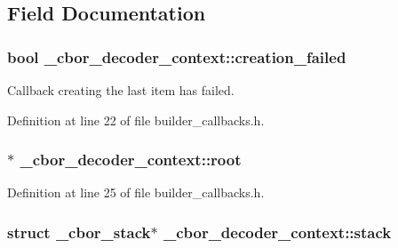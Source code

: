 \subsection{Field Documentation}
\hypertarget{struct__cbor__decoder__context_ada14322afd080c27f3ea76b3ba657505}{
\subsubsection[{creation\-\_\-failed}]{\setlength{\rightskip}{0pt plus 5cm}bool \-\_\-cbor\-\_\-decoder\-\_\-context\-::creation\-\_\-failed}}\label{struct__cbor__decoder__context_ada14322afd080c27f3ea76b3ba657505}


Callback creating the last item has failed. 



Definition at line 22 of file builder\-\_\-callbacks.\-h.

\hypertarget{struct__cbor__decoder__context_ad4c1540245b6241bc7aa3f7ade2fbf5a}{
\subsubsection[{root}]{$\ast$ \-\_\-cbor\-\_\-decoder\-\_\-context\-::root}}\label{struct__cbor__decoder__context_ad4c1540245b6241bc7aa3f7ade2fbf5a}


Definition at line 25 of file builder\-\_\-callbacks.\-h.

\hypertarget{struct__cbor__decoder__context_af21635162948fc488da3c1625f1bc278}{
\subsubsection[{stack}]{\setlength{\rightskip}{0pt plus 5cm}struct {\bf \-\_\-cbor\-\_\-stack}$\ast$ \-\_\-cbor\-\_\-decoder\-\_\-context\-::stack}}\label{struct__cbor__decoder__context_af21635162948fc488da3c1625f1bc278}


